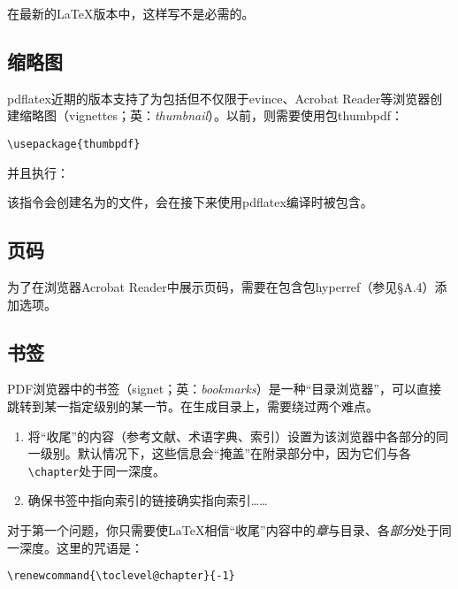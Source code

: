 在最新的\LaTeX 版本中，这样写不是必需的。

\subsection{缩略图}

\textsf{pdflatex}近期的版本支持了为包括但不仅限于\textsf{evince}、\textsf{Acrobat Reader}等浏览器创建缩略图（vignettes；英：\emph{thumbnail}）。以前，则需要使用包\textsf{thumbpdf}：

\begin{dmd}
\verb+\usepackage{thumbpdf}+
\end{dmd}

并且执行：


该指令会创建名为的文件，会在接下来使用\textsf{pdflatex}编译时被包含。

\subsection{页码}

为了在浏览器\textsf{Acrobat Reader}中展示页码，需要在包含包\textsf{hyperref}（参见\S A.4）添加选项。

\subsection{书签}

PDF浏览器中的书签（signet；英：\emph{bookmarks}）是一种``目录浏览器''，可以直接跳转到某一指定级别的某一节。在生成目录上，需要绕过两个难点。

\begin{enumerate}
    \item 将``收尾''的内容（参考文献、术语字典、索引）设置为该浏览器中各部分的同一级别。默认情况下，这些信息会``掩盖''在附录部分中，因为它们与各\verb|\chapter|处于同一深度。
    \item 确保书签中指向索引的链接确实指向索引……
\end{enumerate}

对于第一个问题，你只需要使\LaTeX 相信``收尾''内容中的\emph{章}与目录、各\emph{部分}处于同一深度。这里的咒语是：

\begin{dmd}
\verb|\renewcommand{\toclevel@chapter}{-1}|
\end{dmd}

